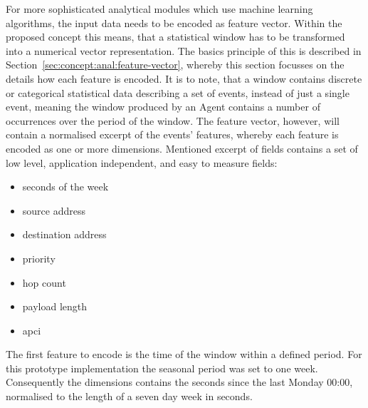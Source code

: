 For more sophisticated analytical modules which use machine learning algorithms, the input data needs to be encoded as feature vector.
Within the proposed concept this means, that a statistical window has to be transformed into a numerical vector representation.
The basics principle of this is described in Section~\ref{sec:concept:anal:feature-vector}, whereby this section focusses on the details how each feature is encoded.
It is to note, that a window contains discrete or categorical statistical data describing a set of events, instead of just a single event, meaning the window produced by an Agent contains a number of occurrences over the period of the window.
The feature vector, however, will contain a normalised excerpt of the events' features, whereby each feature is encoded as one or more dimensions.
Mentioned excerpt of fields contains a set of low level, application independent, and easy to measure fields: 

\begin{itemize}
	\item seconds of the week
	\item source address
	\item destination address
	\item priority
	\item hop count
	\item payload length
	\item \gls{apci}
\end{itemize}

The first feature to encode is the time of the window within a defined period. For this prototype implementation the seasonal period was set to one week. Consequently the dimensions contains the seconds since the last Monday 00:00, normalised to the length of a seven day week in seconds.

